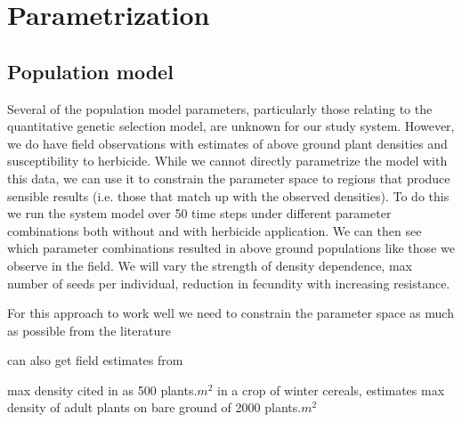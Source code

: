 \documentclass[12pt, a4paper]{article}
\begin{document}
\section{Parametrization}
\subsection{Population model}
Several of the population model parameters, particularly those relating to the quantitative genetic selection model, are unknown for our study system. However, we do have field observations with estimates of above ground plant densities and susceptibility to herbicide. While we cannot directly parametrize the model with this data, we can use it to constrain the parameter space to regions that produce sensible results (i.e. those that match up with the observed densities). To do this we run the system model over 50 time steps under different parameter combinations both without and with herbicide application. We can then see which parameter combinations resulted in above ground populations like those we observe in the field. We will vary the strength of density dependence, max number of seeds per individual, reduction in fecundity with increasing resistance. 

For this approach to work well we need to constrain the parameter space as much as possible from the literature         

can also get field estimates from \cite{Cava1999}

max density cited in \cite{Doyl1986} as 500 plants$.m^2$ in a crop of winter cereals, \cite{Colb2007} estimates max density of adult plants on bare ground of 2000 plants$.m^2$  
\end{document}
